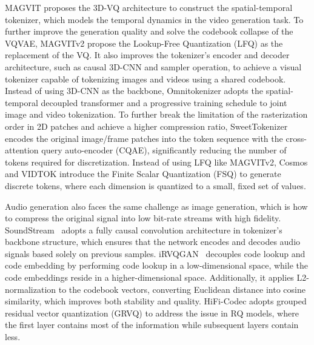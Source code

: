 MAGVIT proposes the 3D-VQ architecture to construct the spatial-temporal tokenizer, which models the temporal dynamics in the video generation task. To further improve the 
generation quality and solve the codebook collapse of the VQVAE, MAGVITv2 \cite{yu2023magvit-v2} propose the Lookup-Free Quantization (LFQ) as the replacement of the VQ. It also improves the tokenizer's encoder and decoder architecture, such as causal 3D-CNN and sampler operation, to achieve a visual tokenizer capable of tokenizing images and videos using a shared codebook.
Instead of using 3D-CNN as the backbone, Omnitokenizer \cite{wang2024omnitokenizer} adopts the spatial-temporal decoupled transformer and a progressive training schedule to joint image and video tokenization.
To further break the limitation of the rasterization order in 2D patches and achieve a higher compression ratio, SweetTokenizer \cite{tan2024sweettokenizer} encodes the original image/frame patches into the token sequence with the cross-attention query auto-encoder (CQAE), significantly reducing the number of tokens required for discretization.
Instead of using LFQ like MAGVITv2, Cosmos \cite{agarwal2025cosmos} and VIDTOK \cite{tang2024vidtok} introduce the Finite Scalar Quantization (FSQ) \cite{mentzer2023fsq} to generate discrete tokens, where each dimension is quantized to a small, fixed set of values.


Audio generation also faces the same challenge as image generation, which is how to compress the original signal into low bit-rate streams with high fidelity. 
SoundStream~\cite{zeghidour2021soundstream} adopts a fully causal convolution architecture in tokenizer's backbone structure, which ensures that the network encodes and decodes audio signals based solely on previous samples.
iRVQGAN~\cite{kumar2024improvedRVQGAN} decouples code lookup and code embedding by performing code lookup in a low-dimensional space, while the code embeddings reside in a higher-dimensional space. Additionally, it applies L2-normalization to the codebook vectors, converting Euclidean distance into cosine similarity, which improves both stability and quality.
HiFi-Codec \cite{yang2023hificodec} adopts grouped residual vector quantization (GRVQ) to address the issue in RQ models, where the first layer contains most of the information while subsequent layers contain less. 



